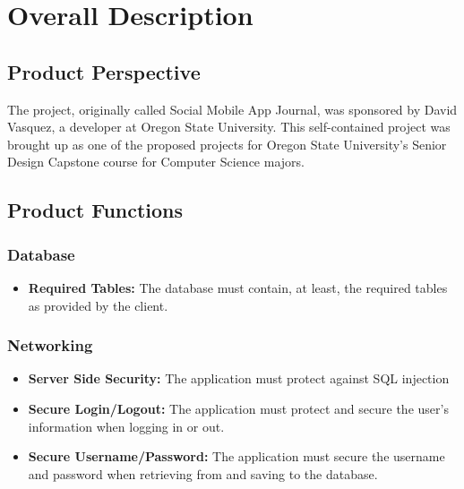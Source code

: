 \documentclass[letterpaper, 10, draftclsnofoot, onecolumn]{IEEEtran}
\begin{document}
\section{Overall Description}

\subsection{Product Perspective}
\indent The project, originally called Social Mobile App Journal, was sponsored by David Vasquez, a developer at Oregon State University. This self-contained project was brought up as one of the proposed projects for Oregon State University's Senior Design Capstone course for Computer Science majors. 

\subsection{Product Functions}

\subsubsection{Database}
\begin{itemize} 

\item \textbf{Required Tables: } The database must contain, at least, the required tables as provided by the client. 
\end{itemize}
\subsubsection{Networking}
\begin{itemize} 

\item \textbf{Server Side Security: } The application must protect against SQL injection
\item \textbf{Secure Login/Logout: } The application must protect and secure the user's information when logging in or out.
\item \textbf{Secure Username/Password:} The application must secure the username and password when retrieving from and saving to the database.

\end{itemize}
\end{document}
